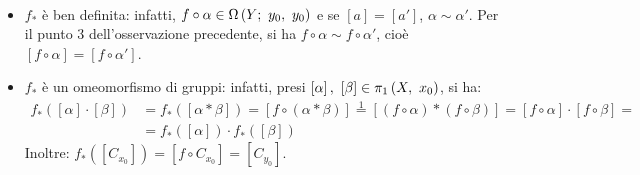 \begin{demonstration}~{}
	\begin{itemize}
		\item $f_{\ast}$ è ben definita: infatti, $f\circ\alpha\in\Omega\left(Y;\ y_0,\ y_0\right)$ e se $\left[a\right]=\left[a'\right]$, $\alpha\sim\alpha'$. Per il punto 3 dell'osservazione precedente, si ha $f\circ \alpha\sim f\circ\alpha'$, cioè $\left[f\circ \alpha\right]=\left[f\circ\alpha'\right]$.
		\item $f_{\ast}$ è un omeomorfismo di gruppi: infatti, presi $\left[\alpha\right],\ \left[\beta\right]\in\gruf{X}{x_0}$, si ha:
		\begin{align*}
			f_{\ast}\left(\left[\alpha\right]\cdot\left[\beta\right]\right)&=f_{\ast}\left(\left[\alpha\ast\beta\right]\right)=\left[f\circ\left(\alpha\ast\beta\right)\right]\stackrel{1}{=}\left[\left(f\circ\alpha\right)\ast\left(f\circ\beta\right)\right]=\left[f\circ\alpha\right]\cdot\left[f\circ\beta\right]=\\&=f_{\ast}\left(\left[\alpha\right]\right)\cdot f_{\ast}\left(\left[\beta\right]\right)
		\end{align*}
	Inoltre: $f_{\ast}\left(\left[C_{x_0}\right]\right)=\left[f\circ C_{x_0}\right]=\left[C_{y_0}\right]$.
	\end{itemize}
\vspace{-3mm}
\end{demonstration}
